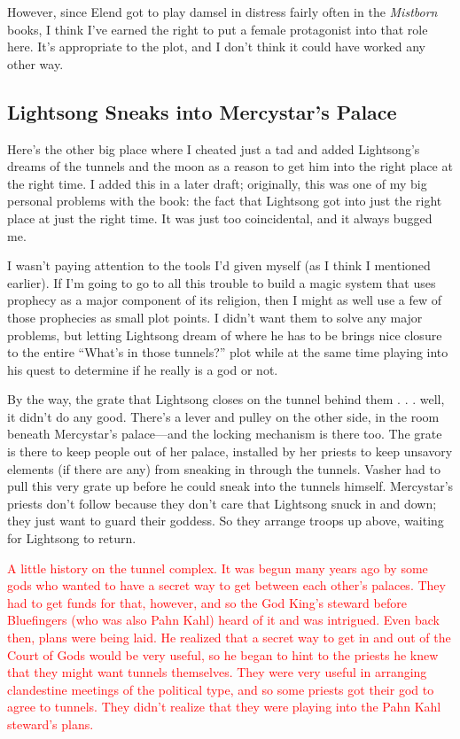 However, since Elend got to play damsel in distress fairly often in the \textit{Mistborn} books, I think I’ve earned the right to put a female protagonist into that role here. It’s appropriate to the plot, and I don’t think it could have worked any other way.

\subsection*{Lightsong Sneaks into Mercystar’s Palace}

Here’s the other big place where I cheated just a tad and added Lightsong’s dreams of the tunnels and the moon as a reason to get him into the right place at the right time. I added this in a later draft; originally, this was one of my big personal problems with the book: the fact that Lightsong got into just the right place at just the right time. It was just too coincidental, and it always bugged me.

I wasn’t paying attention to the tools I’d given myself (as I think I mentioned earlier). If I’m going to go to all this trouble to build a magic system that uses prophecy as a major component of its religion, then I might as well use a few of those prophecies as small plot points. I didn’t want them to solve any major problems, but letting Lightsong dream of where he has to be brings nice closure to the entire “What’s in those tunnels?” plot while at the same time playing into his quest to determine if he really is a god or not.

By the way, the grate that Lightsong closes on the tunnel behind them . . . well, it didn’t do any good. There’s a lever and pulley on the other side, in the room beneath Mercystar’s palace—and the locking mechanism is there too. The grate is there to keep people out of her palace, installed by her priests to keep unsavory elements (if there are any) from sneaking in through the tunnels. Vasher had to pull this very grate up before he could sneak into the tunnels himself. Mercystar’s priests don’t follow because they don’t care that Lightsong snuck in and down; they just want to guard their goddess. So they arrange troops up above, waiting for Lightsong to return.

\textcolor{red}{
A little history on the tunnel complex. It was begun many years ago by some gods who wanted to have a secret way to get between each other’s palaces. They had to get funds for that, however, and so the God King’s steward before Bluefingers (who was also Pahn Kahl) heard of it and was intrigued. Even back then, plans were being laid. He realized that a secret way to get in and out of the Court of Gods would be very useful, so he began to hint to the priests he knew that they might want tunnels themselves. They were very useful in arranging clandestine meetings of the political type, and so some priests got their god to agree to tunnels. They didn’t realize that they were playing into the Pahn Kahl steward’s plans.
}

